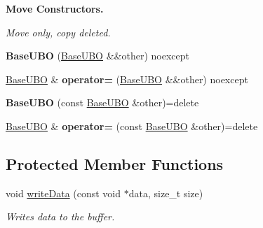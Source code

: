 \begin{Indent}\textbf{ Move Constructors.}\par
{\em Move only, copy deleted. }\begin{DoxyCompactItemize}
\item 
\mbox{\label{classblaze_1_1BaseUBO_aa4e8c0e3f7e7fd07dc58683813e5d033}} 
{\bfseries Base\+U\+BO} (\hyperlink{classblaze_1_1BaseUBO}{Base\+U\+BO} \&\&other) noexcept
\item 
\mbox{\label{classblaze_1_1BaseUBO_a6f81e5b988d6693ff9ac377b7e2d11ea}} 
\hyperlink{classblaze_1_1BaseUBO}{Base\+U\+BO} \& {\bfseries operator=} (\hyperlink{classblaze_1_1BaseUBO}{Base\+U\+BO} \&\&other) noexcept
\item 
\mbox{\label{classblaze_1_1BaseUBO_abc3f978bfb601096b6d0014de995ee42}} 
{\bfseries Base\+U\+BO} (const \hyperlink{classblaze_1_1BaseUBO}{Base\+U\+BO} \&other)=delete
\item 
\mbox{\label{classblaze_1_1BaseUBO_af29582dab41fdc03211a425ab2c09427}} 
\hyperlink{classblaze_1_1BaseUBO}{Base\+U\+BO} \& {\bfseries operator=} (const \hyperlink{classblaze_1_1BaseUBO}{Base\+U\+BO} \&other)=delete
\end{DoxyCompactItemize}
\end{Indent}
\subsection*{Protected Member Functions}
\begin{DoxyCompactItemize}
\item 
void \hyperlink{classblaze_1_1BaseUBO_a76859304045ec034ea2cffe68ea1db65}{write\+Data} (const void $\ast$data, size\+\_\+t size)
\begin{DoxyCompactList}\small\item\em Writes data to the buffer. \end{DoxyCompactList}\end{DoxyCompactItemize}
